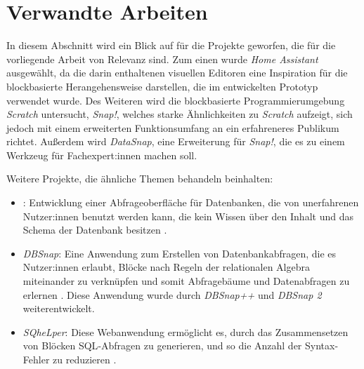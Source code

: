 \section{Verwandte Arbeiten}
\label{sec:projects}

In diesem Abschnitt wird ein Blick auf für die Projekte geworfen, die für die vorliegende Arbeit von Relevanz sind. Zum einen wurde \textit{Home Assistant} ausgewählt, da die darin enthaltenen visuellen Editoren eine Inspiration für die blockbasierte Herangehensweise darstellen, die im entwickelten Prototyp verwendet wurde. Des Weiteren wird die blockbasierte Programmierumgebung \textit{Scratch} untersucht, \textit{Snap!}, welches starke Ähnlichkeiten zu \textit{Scratch} aufzeigt, sich jedoch mit einem erweiterten Funktionsumfang an ein erfahreneres Publikum richtet. Außerdem wird \textit{DataSnap}, eine Erweiterung für \textit{Snap!}, die es zu einem Werkzeug für Fachexpert:innen machen soll.

Weitere Projekte, die ähnliche Themen behandeln beinhalten:
\begin{itemize}
  \item \textit{}: Entwicklung einer Abfrageoberfläche für Datenbanken, die von unerfahrenen Nutzer:innen benutzt werden kann, die kein Wissen über den Inhalt und das Schema der Datenbank besitzen \parencite{pazosr.InterfaceComposing2015}.
  \item \textit{DBSnap}: Eine Anwendung zum Erstellen von Datenbankabfragen, die es Nutzer:innen erlaubt, Blöcke nach Regeln der relationalen Algebra miteinander zu verknüpfen und somit Abfragebäume und Datenabfragen zu erlernen \parencite{silvaDBSnapLearning2015}. Diese Anwendung wurde durch \textit{DBSnap++} \parencite{silvaDBSnapCreating2018} und \textit{DBSnap 2} \parencite{silvaDBSnapNew2022} weiterentwickelt.
  \item \textit{SQheLper}: Diese Webanwendung ermöglicht es, durch das Zusammensetzen von Blöcken \acs{SQL}-Abfragen zu generieren, und so die Anzahl der Syntax-Fehler zu reduzieren \parencite{jacobsSQheLperBlockbased2021}.
\end{itemize}
